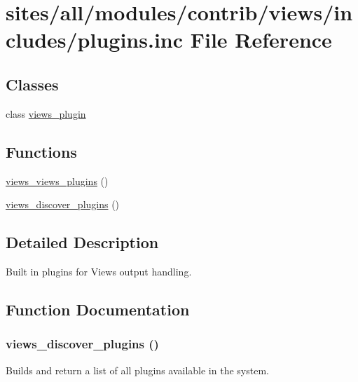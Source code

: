 \hypertarget{plugins_8inc}{
\section{sites/all/modules/contrib/views/includes/plugins.inc File Reference}
\label{plugins_8inc}
}
\subsection*{Classes}
\begin{CompactItemize}
\item 
class \hyperlink{classviews__plugin}{views\_\-plugin}
\end{CompactItemize}
\subsection*{Functions}
\begin{CompactItemize}
\item 
\hyperlink{plugins_8inc_89b4d3bd8e15dca9a33e85b203218b8d}{views\_\-views\_\-plugins} ()
\item 
\hyperlink{plugins_8inc_c694df6695d73aa943913be2707516f5}{views\_\-discover\_\-plugins} ()
\end{CompactItemize}


\subsection{Detailed Description}
Built in plugins for Views output handling. 

\subsection{Function Documentation}
\hypertarget{plugins_8inc_c694df6695d73aa943913be2707516f5}{
\subsubsection[{views\_\-discover\_\-plugins}]{\setlength{\rightskip}{0pt plus 5cm}views\_\-discover\_\-plugins ()}}
\label{plugins_8inc_c694df6695d73aa943913be2707516f5}


Builds and return a list of all plugins available in the system.

